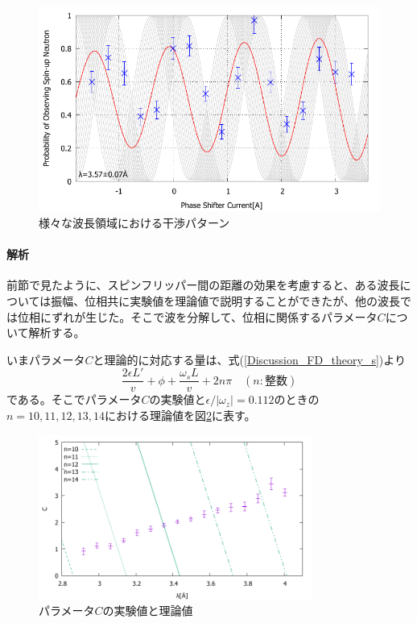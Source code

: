 \begin{figure}[H]
\begin{minipage}{0.5\hsize}
\end{minipage}
\begin{minipage}{0.5\hsize}
\includegraphics[width=\hsize]{discussion/FD/IT_s_500.pdf}
\end{minipage}
\caption{様々な波長領域における干渉パターン}\label{Discussion_FD_fig_s}
\end{figure}

\paragraph{解析}
前節で見たように、スピンフリッパー間の距離の効果を考慮すると、ある波長については振幅、位相共に実験値を理論値で説明することができたが、他の波長では位相にずれが生じた。そこで波を分解して、位相に関係するパラメータ$C$について解析する。

いまパラメータ$C$と理論的に対応する量は、式(\ref{Discussion_FD_theory_s})より
\begin{equation}
\frac{2\epsilon L'}{v} +\phi +\frac{\omega_s L}{v}+2n\pi \quad (n:整数)
\end{equation}
である。そこでパラメータ$C$の実験値と$\epsilon/|\omega_z|=0.112$のときの$n=10,11,12,13,14$における理論値を図\ref{Discussion_FD_fig_C_s_470_fit}に表す。
\begin{figure}[H]
\centering
\includegraphics[width=9cm]{discussion/FD/C_s_470_fit.pdf}
\caption{パラメータ$C$の実験値と理論値}\label{Discussion_FD_fig_C_s_470_fit}
\end{figure}

